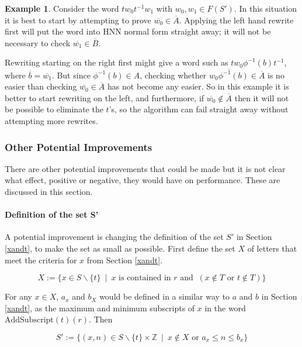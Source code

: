 \documentclass[12pt]{article} %
\theoremstyle{definition}
\theoremstyle{definition}
\theoremstyle{definition}
\theoremstyle{definition}
\theoremstyle{definition}
\theoremstyle{definition}
\newtheorem{exmpl}{Example}[theorem]
\begin{document}
\begin{exmpl}\label{rtlbad}
Consider the word $tw_0t^{-1}w_1$ with $w_0, w_1 \in F(S')$. In this situation
it is best to start by attempting to prove $\overline{w_0} \in \overline{A}$.
Applying the left hand rewrite first will put the word into HNN normal form
straight away; it will not be necessary to check $\overline{w_1} \in \overline{B}$.

Rewriting starting on the right first might give a word such as
$tw_0 \phi^{-1}(b)t^{-1}$, where $\overline{b} = \overline{w_1}$. But since
$\phi^{-1}(b) \in A$, checking whether $\overline{w_0\phi^{-1}(b)} \in \overline{A}$ is
no easier than checking $\overline{w_0} \in \overline{A}$ has not become
any easier. So in this example it is better to start rewriting on the left, and furthermore,
if $\overline{w_0} \notin \overline{A}$ then it will not be possible to eliminate the $t$'s, so the
algorithm can fail straight away without attempting more rewrites.

\subsubsection{Other Potential Improvements}

There are other potential improvements that could be made but it is not clear
what effect, positive or negative, they would have on performance. These are discussed
in this section.

\paragraph{Definition of the set S'}

A potential improvement is changing the definition of the set $S'$ in Section \ref{xandt},
to make the set as small as possible.
First define the set $X$
of letters that meet the criteria for $x$ from Section \ref{xandt}.

\begin{equation}
  X := \{ x \in S \backslash \{t\} \ \mid \
    x \text{ is contained in }r \text{ and } \ (x \notin T \text{ or } t \notin T) \}
\end{equation}

For any $x \in X$, $a_x$ and $b_X$ would be defined in a similar way to $a$ and
$b$ in Section \ref{xandt}, as the maximum and minimum subscripts of $x$ in the word
$\text{AddSubscript}(t)(r)$. Then

\begin{equation}
  S' := \{(x, n) \in S \backslash \{t\} \times \mathbb{Z} \
\mid \ x \notin X \text{ or } a_x \le n \le b_x \}
\end{equation}


\end{exmpl}
\end{document}
